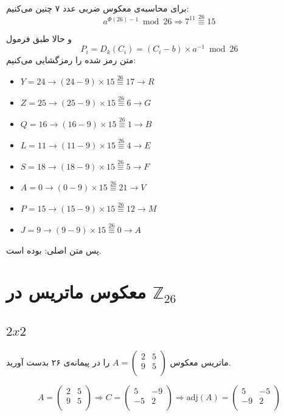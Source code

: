 \documentclass{article}
\newcommand{\modts}{\overset{26}{\equiv}}
\begin{document}
برای محاسبه‌‌ی معکوس ضربی عدد ۷ چنین می‌کنیم:
\begin{equation*}
a^{\Phi(26) - 1} \bmod{26} \Rightarrow 7^{11} \modts 15
\end{equation*}

و حالا طبق فرمول
\begin{equation}
P_i = D_k(C_i) = (C_i - b) \times a^{-1} \bmod{26}
\end{equation}
متن رمز شده را رمزگشایی می‌کنیم:
\begin{latin}
\begin{itemize}
\item $Y = 24 \rightarrow (24 - 9)\times15 \modts 17 \rightarrow R$
\item $Z = 25 \rightarrow (25 - 9)\times15 \modts 6 \rightarrow G$
\item $Q = 16 \rightarrow (16 - 9)\times15 \modts 1 \rightarrow B$
\item $L = 11 \rightarrow (11 - 9)\times15 \modts 4 \rightarrow E$
\item $S = 18 \rightarrow (18 - 9)\times15 \modts 5 \rightarrow F$
\item $A = 0 \rightarrow (0 - 9)\times15 \modts 21 \rightarrow V$
\item $P = 15 \rightarrow (15 - 9)\times15 \modts 12 \rightarrow M$
\item $J = 9 \rightarrow (9 - 9)\times15 \modts 0 \rightarrow A$
\end{itemize}
\end{latin}
پس متن اصلی:
بوده است.

\section{معکوس ماتریس در $\mathbb{Z}_{26}$}
\subsection{$2x2$}
ماتریس معکوس 
$A = 
\begin{pmatrix}
2 & 5 \\
9 & 5 \\
\end{pmatrix}$
را در پیمانه‌ی ۲۶ بدست آورید.

\begin{equation*}
A = 
\begin{pmatrix}
2 & 5 \\
9 & 5 \\
\end{pmatrix} \Rightarrow 
C = 
\begin{pmatrix}
5 & -9 \\
-5 & 2 \\
\end{pmatrix} \Rightarrow 
\mathrm{adj}(A) = 
\begin{pmatrix}
5 & -5 \\
-9 & 2 \\
\end{pmatrix} 
\end{equation*}
\end{document}

